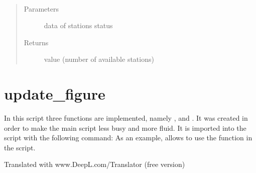 \documentclass[letterpaper,10pt,english]{sphinxmanual}
\begin{document}
\begin{fulllineitems}
\label{\detokenize{app:update_available}}~\begin{quote}\begin{description}
\item[{Parameters}] \leavevmode
\sphinxAtStartPar
{} \textendash{} data of stations status

\item[{Returns}] \leavevmode
\sphinxAtStartPar
value (number of available stations)

\end{description}\end{quote}

\end{fulllineitems}



\section{update\_figure}
\label{\detokenize{update_figure:update-figure}}\label{\detokenize{update_figure::doc}}
\sphinxAtStartPar
In this script three functions are implemented, namely ,  and .
It was created in order to make the main  script less busy and more fluid.
It is imported into the  script with the following command: 
As an example,  allows to use the  function in the  script.

\sphinxAtStartPar
Translated with www.DeepL.com/Translator (free version)
\end{document}
